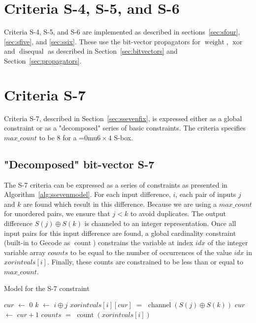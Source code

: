 \documentclass[a4paper,10pt,twoside,openright]{book}
\newcommand*\sixbyfour{\begingroup\medmuskip=0mu\relax$6 \times 4$\endgroup}
\newcommand*\Let[2]{\State #1 $\gets$ #2}
\newcommand*\Equivalent[2]{\State #1 $=$ #2}
\DeclareMathOperator{\weight}{weight}
\DeclareMathOperator{\disequal}{disequal}
\DeclareMathOperator{\funccount}{count}
\DeclareMathOperator{\xor}{xor}
\DeclareMathOperator{\channel}{channel}
\begin{document}
\section{Criteria S-4, S-5, and S-6}
\label{sec:models4}
Criteria S-4, S-5, and S-6 are implemented 
as described in sections~\ref{sec:sfour}, \ref{sec:sfive}, and \ref{sec:ssix}.
These use the bit-vector propagators for $\weight$, $\xor$ and $\disequal$
as described in Section~\ref{sec:bitvectors} and Section~\ref{sec:propagators}.

\section{Criteria S-7}
Criteria S-7, described in Section~\ref{sec:ssevenfix},
is expressed either as a global constraint 
or as a "decomposed" series of basic constraints.
The criteria specifies $\mathit{max\_count}$ to be $8$ for a \sixbyfour{} S-box.

\subsection{"Decomposed" bit-vector S-7}
\label{sec:bitvecssevendecomp}
The S-7 criteria can be expressed as a series of constraints as presented in
Algorithm~\ref{alg:ssevenmodel}. 
For each input difference, $i$, each pair of inputs $j$ and $k$ are found which 
result in this difference. Because we are using a $\mathit{max\_count}$ for 
unordered pairs, we ensure that $j < k$ to avoid duplicates. 
The output difference $S(j) \oplus S(k)$ is channeled to an integer representation.
Once all input pairs for this input difference are found, 
a global cardinality constraint (built-in to Gecode as $\funccount$)
constrains the variable at index $\mathit{idx}$ of 
the integer variable array $\mathit{counts}$ to be equal 
to the number of occurrences of the value $\mathit{idx}$ 
in $\mathit{xorintvals}[i]$.
Finally, these counts are constrained to be less than or equal to
$\mathit{max\_count}$.
\begin{algorithm}
    \caption{Model for the S-7 constraint}
    \label{alg:ssevenmodel}
    \begin{algorithmic}
            \Let{$\mathit{cur}$}{$0$}
                \Let{$k$}{$i \oplus j$}
                    \Equivalent{$\mathit{xorintvals}[i][cur]$}{$\channel(S(j) \oplus S(k))$}
                    \Let{$\mathit{cur}$}{$\mathit{cur} + 1$}
                \EndIf
            \EndFor
            \Equivalent{$\mathit{counts}$}{$\funccount(\mathit{xorintvals}[i])$}
        \EndFor
    \end{algorithmic}
\end{algorithm}
\end{document}
